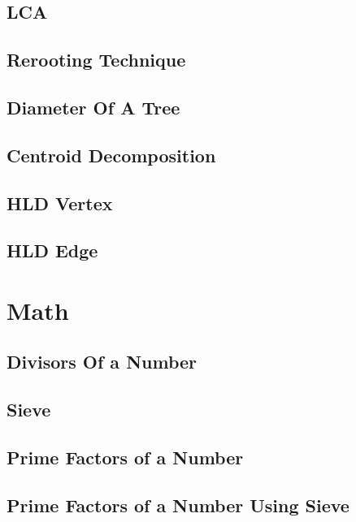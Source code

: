 \subsection{LCA}
\raggedbottom
\hrulefill
\subsection{Rerooting Technique}
\raggedbottom
\hrulefill
\subsection{Diameter Of A Tree}
\raggedbottom
\hrulefill
\subsection{Centroid Decomposition}
\raggedbottom
\hrulefill
\subsection{HLD Vertex}
\raggedbottom
\hrulefill
\subsection{HLD Edge}
\raggedbottom
\hrulefill

\section{Math}
\subsection{Divisors Of a Number}
\raggedbottom
\hrulefill
\subsection{Sieve}
\raggedbottom
\hrulefill
\subsection{Prime Factors of a Number}
\raggedbottom
\hrulefill
\subsection{Prime Factors of a Number Using Sieve}
\raggedbottom
\hrulefill
